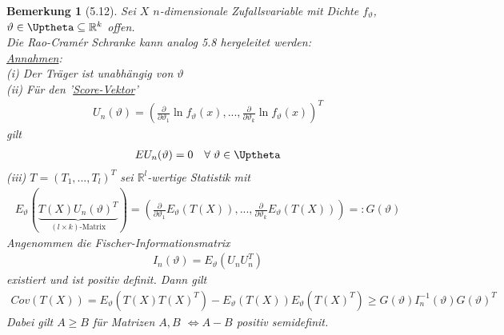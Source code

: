 \documentclass[a4paper,openany]{book}
\theoremstyle{mytheoremstyle}
\newtheorem*{bem}{Bemerkung}
\theoremstyle{mytheoremstyle2}
\begin{document}
\begin{bem}[5.12]
  Sei $X$ $n$-dimensionale Zufallsvariable mit Dichte $f _{\vartheta }$, $\vartheta  \in \Uptheta \subseteq \mathbb{R}^k$ offen. \\
  Die Rao-Cramér Schranke kann analog 5.8 hergeleitet werden: \\
  \underline{Annahmen}: \\
  (i) Der Träger ist unabhängig von $\vartheta $ \\
  (ii) Für den '\underline{Score-Vektor}' 
  \begin{align*}
    U _n(\vartheta )=\left(\frac{\partial }{\partial \vartheta _1}\ln f _{\vartheta }(x),...,\frac{\partial }{\partial \vartheta _k}\ln f _{\vartheta }(x)\right)^T
  \end{align*}
  gilt 
  \begin{align*}
    E U_n(\vartheta )=0 \quad \forall\;\vartheta \in \Uptheta
  \end{align*}
  (iii) $T=(T_1,...,T_l)^T$ sei $\mathbb{R}^l$-wertige Statistik mit 
  \begin{align*}
    E _{\vartheta }(\underbrace{T(X)U_n(\vartheta )^T}_{(l \times k)\text{-Matrix}})=\left(\frac{\partial }{\partial \vartheta _1}E _{\vartheta }(T(X)),...,\frac{\partial }{\partial \vartheta _k}E _{\vartheta }(T(X))\right)=:G(\vartheta )
  \end{align*}
  Angenommen die Fischer-Informationsmatrix 
  \begin{align*}
    I _{n}(\vartheta )=E _{\vartheta }(U_nU_n^T)
  \end{align*}
  existiert und ist positiv definit. Dann gilt
  \begin{align*}
    Cov(T(X))=E _{\vartheta }(T(X)T(X)^T)-E _{\vartheta }(T(X))E _{\vartheta }(T(X)^T)\geq G(\vartheta )I_n ^{-1}(\vartheta )G(\vartheta )^T
  \end{align*}
  Dabei gilt $A \geq B$ für Matrizen $A,B$ $\Leftrightarrow A-B$ positiv semidefinit.  \\
  \end{bem}
\end{document}
